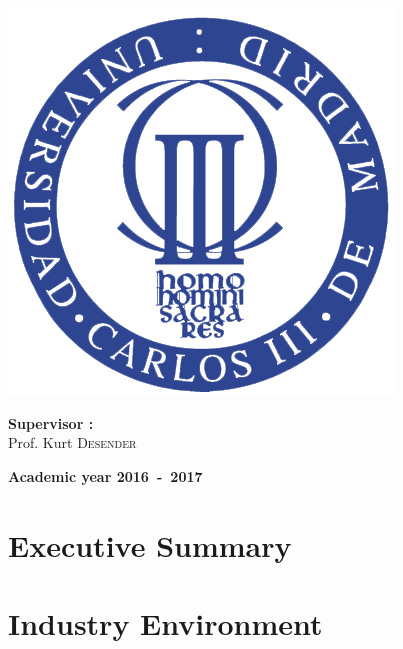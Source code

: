 \documentclass[12pt,a4paper,oneside]{book}
\begin{document}
\begin{titlepage}
\begin{center}
\includegraphics[keepaspectratio=true,width=\textwidth-2cm]{images/Seal_of_the_University_of_Carlos_III.jpg}
\vfill{}
\begin{flushleft}{\large \textbf{Supervisor  :}}\\
{\large Prof. Kurt \textsc{Desender}}
\end{flushleft}{\large\par}
\vfill{}\vfill{}\enlargethispage{2cm}
\textbf{Academic year 2016~-~2017}
\end{center}
\end{titlepage}



\newpage
\thispagestyle{empty} 
\null

\frontmatter

\tableofcontents

\mainmatter

\chapter{Executive Summary}

\chapter{Industry Environment}
\label{iechap}
\end{document}
